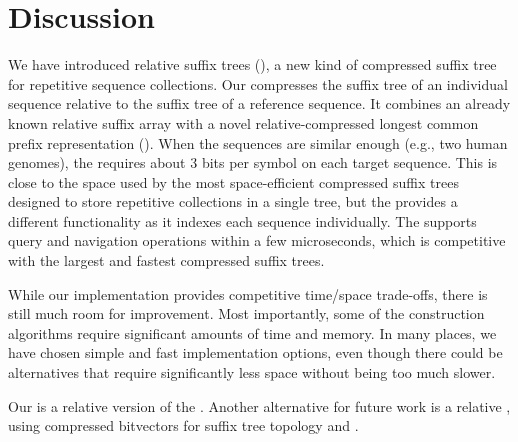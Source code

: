 

\section{Discussion}\label{section:discussion}

We have introduced relative suffix trees (\RCST), a new kind of compressed suffix tree for repetitive sequence collections. Our \RCST{} compresses the suffix tree of an individual sequence relative to the suffix tree of a reference sequence. It combines an already known relative suffix array with a novel relative-compressed longest common prefix representation (\RLCP). When the sequences are similar enough (e.g., two human genomes), the \RCST{} requires about 3 bits per symbol on each target sequence. This is close to the space used by the most space-efficient compressed suffix trees designed to store repetitive collections in a single tree, but the \RCST{} provides a different functionality as it indexes each sequence individually. The \RCST{} supports query and navigation operations within a few microseconds, which is competitive with the largest and fastest compressed suffix trees.

While our \RCST{} implementation provides competitive time/space trade-offs, there is still much room for improvement. Most importantly, some of the construction algorithms require significant amounts of time and memory. In many places, we have chosen simple and fast implementation options, even though there could be alternatives that require significantly less space without being too much slower.

Our \RCST{} is a relative version of the \CSTnpr. Another alternative for future work is a relative \CSTsada, using \RLZ{} compressed bitvectors for suffix tree topology and \PLCP. %


